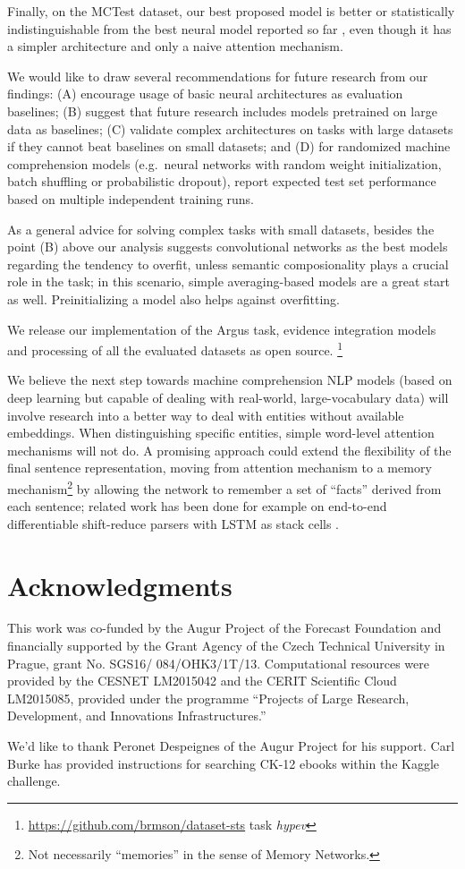 \documentclass[11pt]{article}
\begin{document}
Finally, on the MCTest dataset, our best proposed model is better
or statistically
indistinguishable from the best neural model reported so far
\cite{HABCNN},
even though it has a simpler architecture and only a naive attention
mechanism.

We would like to draw several recommendations for future research from our findings:
(A) encourage usage of basic neural architectures as evaluation baselines;
(B) suggest that future research includes models pretrained on large data as baselines;
(C) validate complex architectures on tasks with large datasets if they cannot beat baselines on small datasets; and
(D) for randomized machine comprehension models (e.g.\ neural networks with random weight
initialization, batch shuffling or probabilistic dropout), report expected test set performance
based on multiple independent training runs.

As a general advice for solving complex tasks with small datasets,
besides the point (B) above our analysis suggests convolutional networks
as the best models regarding the tendency to overfit, unless
semantic composionality plays a crucial role in the task;
in this scenario, simple averaging-based models are a great start as well.
Preinitializing a model also helps against overfitting.

We release our implementation of the Argus task, evidence integration
models and processing of all the evaluated datasets as open source.%
\footnote{\url{https://github.com/brmson/dataset-sts} task \textit{hypev}}

We believe the next step towards machine comprehension NLP models
(based on deep learning but capable of dealing with real-world,
large-vocabulary data) will involve research into a better way to deal with
entities without available embeddings. %
When distinguishing specific entities,
simple word-level attention mechanisms will not do.
A promising approach could extend
the flexibility of the final sentence representation, moving from attention mechanism
to a memory mechanism\footnote{Not necessarily ``memories'' in the sense of Memory Networks.}
by allowing the network to remember a set of ``facts'' derived from each sentence;
related work has been done for example on end-to-end differentiable shift-reduce parsers
with LSTM as stack cells \cite{EndToEndParsing}.


\section*{Acknowledgments}
{\footnotesize
	This work was co-funded by the Augur Project of the Forecast Foundation
and financially supported by the Grant Agency of the Czech Technical
University in Prague, grant No. SGS16/ 084/OHK3/1T/13.
Computational resources were provided by the CESNET LM2015042 and the CERIT Scientific Cloud LM2015085,
provided under the programme ``Projects of Large Research, Development, and Innovations Infrastructures.''

We'd like to thank Peronet Despeignes of the Augur Project for his support.
Carl Burke has provided instructions for searching CK-12 ebooks within
the Kaggle challenge.}



\end{document}
